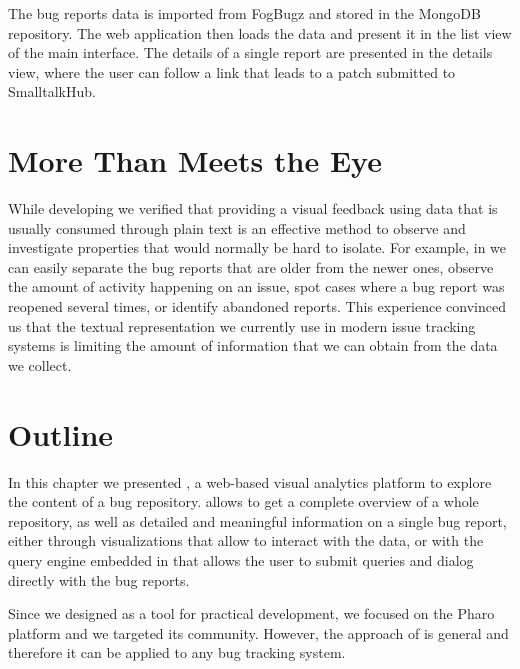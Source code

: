 
The bug reports data is imported from FogBugz and stored in the MongoDB repository.
The web application then loads the data and present it in the list view of the main interface.
The details of a single report are presented in the details view, where the user can follow a link that leads to a patch submitted to SmalltalkHub.
%


\section{More Than Meets the Eye}

While developing \ib we verified that providing a visual feedback using data that is usually consumed through plain text is an effective method to observe and investigate properties that would normally be hard to isolate.
For example, in  we can easily separate the bug reports that are older from the newer ones, observe the amount of activity happening on an issue, spot cases where a bug report was reopened several times, or identify abandoned reports.
This experience convinced us that the textual representation we currently use in modern issue tracking systems is limiting the amount of information that we can obtain from the data we collect.


\newpage
\section{Outline}\label{sec:visualize-summary}

In this chapter we presented \ib, a web-based visual analytics platform to explore the content of a bug repository.
\ib allows to get a complete overview of a whole repository, as well as detailed and meaningful information on a single bug report, either through visualizations that allow to interact with the data, or with the query engine embedded in \ib that allows the user to submit queries and dialog directly with the bug reports.


Since we designed \ib as a tool for practical development, we focused on the Pharo platform and we targeted its community.
However, the approach of \ib is general and therefore it can be applied to any bug tracking system.


